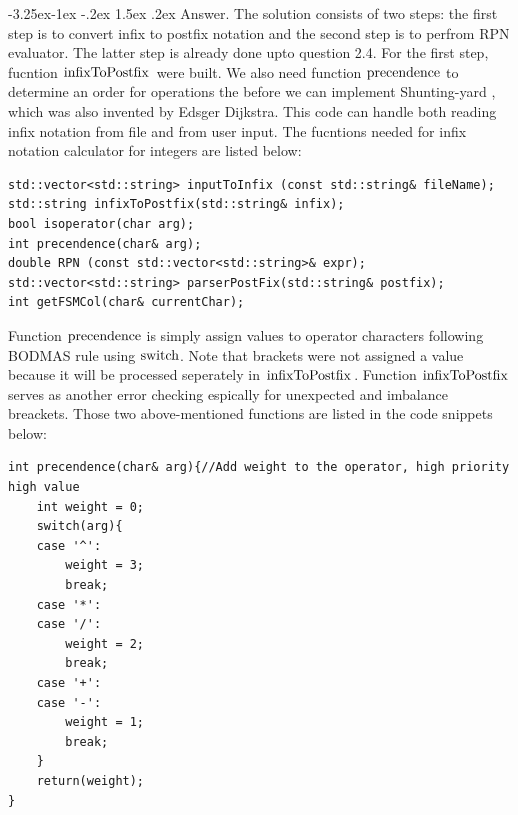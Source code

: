 \documentclass[a4paper,12pt]{article}%
\makeatletter
\renewcommand\subsubsection{\@startsection{subsection}{2}{\z@}%
                                     {-3.25ex\@plus -1ex \@minus -.2ex}%
                                     {1.5ex \@plus .2ex}%
                                     {\normalfont\bfseries\itshape}}%
\makeatother
\begin{document}
\subsubsection{Answer.}
The solution consists of two steps: the first step is to convert infix to postfix notation and the second step is to perfrom RPN evaluator. The latter step is already done upto question 2.4. For the first step, fucntion $\lstinline{infixToPostfix}$ were built. We also need function $\lstinline{precendence}$ to determine an order for operations the before we can implement Shunting-yard \cite[]{kushwaha2014}, which was also invented by Edsger Dijkstra. This code can handle both reading infix notation from file and from user input. The fucntions needed for infix notation calculator for integers are listed below:
\begin{lstlisting}
std::vector<std::string> inputToInfix (const std::string& fileName);
std::string infixToPostfix(std::string& infix); 
bool isoperator(char arg);
int precendence(char& arg);
double RPN (const std::vector<std::string>& expr);
std::vector<std::string> parserPostFix(std::string& postfix);
int getFSMCol(char& currentChar); 
\end{lstlisting}
Function $\lstinline{precendence}$ is simply assign values to operator characters following BODMAS rule using $\lstinline{switch}$. Note that brackets were not assigned a value because it will be processed seperately in $\lstinline{infixToPostfix}$. Function $\lstinline{infixToPostfix}$ serves as another error checking espically for unexpected and imbalance breackets. Those two above-mentioned functions are listed in the code snippets below:
\begin{lstlisting}[title = $\lstinline{precendence}$]
int precendence(char& arg){//Add weight to the operator, high priority high value
    int weight = 0;
    switch(arg){
    case '^':
        weight = 3;
        break;
    case '*':
    case '/':
        weight = 2;
        break;
    case '+':
    case '-':
        weight = 1;
        break;
    }
    return(weight);
}
\end{lstlisting}
\end{document}
